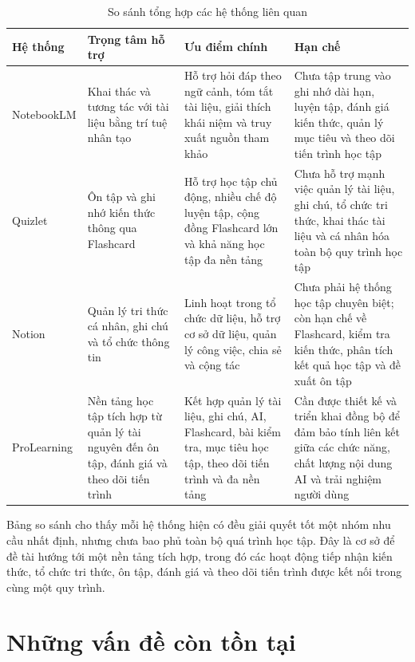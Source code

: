 \begin{table}[ht]
\centering
\small
\setlength{\tabcolsep}{5pt}
\caption{So sánh tổng hợp các hệ thống liên quan}
\label{tab:related-systems-comparison}
\begin{tabular}{|L{2.0cm}|L{3.3cm}|L{4.3cm}|L{4.8cm}|}
\hline
\textbf{Hệ thống} & \textbf{Trọng tâm hỗ trợ} & \textbf{Ưu điểm chính} & \textbf{Hạn chế} \\
\hline
NotebookLM & Khai thác và tương tác với tài liệu bằng trí tuệ nhân tạo & Hỗ trợ hỏi đáp theo ngữ cảnh, tóm tắt tài liệu, giải thích khái niệm và truy xuất nguồn tham khảo & Chưa tập trung vào ghi nhớ dài hạn, luyện tập, đánh giá kiến thức, quản lý mục tiêu và theo dõi tiến trình học tập \\
\hline
Quizlet & Ôn tập và ghi nhớ kiến thức thông qua Flashcard & Hỗ trợ học tập chủ động, nhiều chế độ luyện tập, cộng đồng Flashcard lớn và khả năng học tập đa nền tảng & Chưa hỗ trợ mạnh việc quản lý tài liệu, ghi chú, tổ chức tri thức, khai thác tài liệu và cá nhân hóa toàn bộ quy trình học tập \\
\hline
Notion & Quản lý tri thức cá nhân, ghi chú và tổ chức thông tin & Linh hoạt trong tổ chức dữ liệu, hỗ trợ cơ sở dữ liệu, quản lý công việc, chia sẻ và cộng tác & Chưa phải hệ thống học tập chuyên biệt; còn hạn chế về Flashcard, kiểm tra kiến thức, phân tích kết quả học tập và đề xuất ôn tập \\
\hline
ProLearning & Nền tảng học tập tích hợp từ quản lý tài nguyên đến ôn tập, đánh giá và theo dõi tiến trình & Kết hợp quản lý tài liệu, ghi chú, AI, Flashcard, bài kiểm tra, mục tiêu học tập, theo dõi tiến trình và đa nền tảng & Cần được thiết kế và triển khai đồng bộ để đảm bảo tính liên kết giữa các chức năng, chất lượng nội dung AI và trải nghiệm người dùng \\
\hline
\end{tabular}
\end{table}

Bảng so sánh cho thấy mỗi hệ thống hiện có đều giải quyết tốt một nhóm nhu cầu nhất định, nhưng chưa bao phủ toàn bộ quá trình học tập. Đây là cơ sở để đề tài hướng tới một nền tảng tích hợp, trong đó các hoạt động tiếp nhận kiến thức, tổ chức tri thức, ôn tập, đánh giá và theo dõi tiến trình được kết nối trong cùng một quy trình.

\section{Những vấn đề còn tồn tại}

